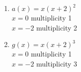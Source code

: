 \documentclass{ximera}
\begin{document}
\begin{multicols}{2}
\begin{enumerate}
\setcounter{enumi}{\value{HW}}

\item $a(x) = x(x + 2)^{2}$\\
$x = 0$ multiplicity 1\\
$x = -2$ multiplicity 2\\


\vfill

\columnbreak

\item $g(x) = x(x + 2)^{3}$\\
$x = 0$ multiplicity 1\\
$x = -2$ multiplicity 3\\



\setcounter{HW}{\value{enumi}}
\end{enumerate}
\end{multicols}
\end{document}
